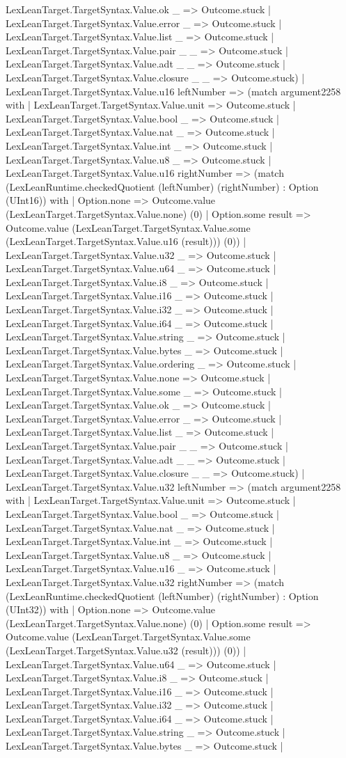 \documentclass[11pt]{article}
\begin{document}
LexLeanTarget.TargetSyntax.Value.ok \_ => Outcome.stuck | LexLeanTarget.TargetSyntax.Value.error \_ => Outcome.stuck | LexLeanTarget.TargetSyntax.Value.list \_ => Outcome.stuck | LexLeanTarget.TargetSyntax.Value.pair \_ \_ => Outcome.stuck | LexLeanTarget.TargetSyntax.Value.adt \_ \_ => Outcome.stuck | LexLeanTarget.TargetSyntax.Value.closure \_ \_ => Outcome.stuck) | LexLeanTarget.TargetSyntax.Value.u16 leftNumber => (match argument2258 with | LexLeanTarget.TargetSyntax.Value.unit => Outcome.stuck | LexLeanTarget.TargetSyntax.Value.bool \_ => Outcome.stuck | LexLeanTarget.TargetSyntax.Value.nat \_ => Outcome.stuck | LexLeanTarget.TargetSyntax.Value.int \_ => Outcome.stuck | LexLeanTarget.TargetSyntax.Value.u8 \_ => Outcome.stuck | LexLeanTarget.TargetSyntax.Value.u16 rightNumber => (match (LexLeanRuntime.checkedQuotient (leftNumber) (rightNumber) : Option (UInt16)) with | Option.none => Outcome.value (LexLeanTarget.TargetSyntax.Value.none) (0) | Option.some result => Outcome.value (LexLeanTarget.TargetSyntax.Value.some (LexLeanTarget.TargetSyntax.Value.u16 (result))) (0)) | LexLeanTarget.TargetSyntax.Value.u32 \_ => Outcome.stuck | LexLeanTarget.TargetSyntax.Value.u64 \_ => Outcome.stuck | LexLeanTarget.TargetSyntax.Value.i8 \_ => Outcome.stuck | LexLeanTarget.TargetSyntax.Value.i16 \_ => Outcome.stuck | LexLeanTarget.TargetSyntax.Value.i32 \_ => Outcome.stuck | LexLeanTarget.TargetSyntax.Value.i64 \_ => Outcome.stuck | LexLeanTarget.TargetSyntax.Value.string \_ => Outcome.stuck | LexLeanTarget.TargetSyntax.Value.bytes \_ => Outcome.stuck | LexLeanTarget.TargetSyntax.Value.ordering \_ => Outcome.stuck | LexLeanTarget.TargetSyntax.Value.none => Outcome.stuck | LexLeanTarget.TargetSyntax.Value.some \_ => Outcome.stuck | LexLeanTarget.TargetSyntax.Value.ok \_ => Outcome.stuck | LexLeanTarget.TargetSyntax.Value.error \_ => Outcome.stuck | LexLeanTarget.TargetSyntax.Value.list \_ => Outcome.stuck | LexLeanTarget.TargetSyntax.Value.pair \_ \_ => Outcome.stuck | LexLeanTarget.TargetSyntax.Value.adt \_ \_ => Outcome.stuck | LexLeanTarget.TargetSyntax.Value.closure \_ \_ => Outcome.stuck) | LexLeanTarget.TargetSyntax.Value.u32 leftNumber => (match argument2258 with | LexLeanTarget.TargetSyntax.Value.unit => Outcome.stuck | LexLeanTarget.TargetSyntax.Value.bool \_ => Outcome.stuck | LexLeanTarget.TargetSyntax.Value.nat \_ => Outcome.stuck | LexLeanTarget.TargetSyntax.Value.int \_ => Outcome.stuck | LexLeanTarget.TargetSyntax.Value.u8 \_ => Outcome.stuck | LexLeanTarget.TargetSyntax.Value.u16 \_ => Outcome.stuck | LexLeanTarget.TargetSyntax.Value.u32 rightNumber => (match (LexLeanRuntime.checkedQuotient (leftNumber) (rightNumber) : Option (UInt32)) with | Option.none => Outcome.value (LexLeanTarget.TargetSyntax.Value.none) (0) | Option.some result => Outcome.value (LexLeanTarget.TargetSyntax.Value.some (LexLeanTarget.TargetSyntax.Value.u32 (result))) (0)) | LexLeanTarget.TargetSyntax.Value.u64 \_ => Outcome.stuck | LexLeanTarget.TargetSyntax.Value.i8 \_ => Outcome.stuck | LexLeanTarget.TargetSyntax.Value.i16 \_ => Outcome.stuck | LexLeanTarget.TargetSyntax.Value.i32 \_ => Outcome.stuck | LexLeanTarget.TargetSyntax.Value.i64 \_ => Outcome.stuck | LexLeanTarget.TargetSyntax.Value.string \_ => Outcome.stuck | LexLeanTarget.TargetSyntax.Value.bytes \_ => Outcome.stuck | 
\end{document}
